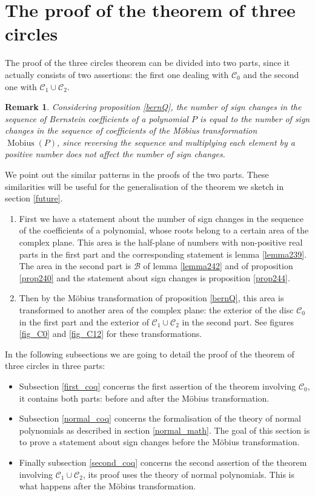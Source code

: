 \documentclass[11pt, a4paper]{article}
\newtheorem{remark}[mtheorem]{Remark}
\DeclareMathOperator{\Mob}{M{o}bius}
\newcommand{\ssb}{{\mathcal B}}
\newcommand{\ssc}{{\mathcal C}}
\begin{document}

\section{The proof of the theorem of three circles}

The proof of the three circles theorem can be divided into two parts, since it actually consists of two assertions: the first one dealing with $\ssc_0$ and the second one with $\ssc_1 \cup \ssc_2$.

\begin{remark}
Considering proposition \ref{bernQ}, the number of sign changes in the sequence of Bernstein coefficients of a polynomial $P$ is equal to the number of sign changes in the sequence of coefficients of the M\"obius transformation $\Mob(P)$, since reversing the sequence and multiplying each element by a positive number does not affect the number of sign changes.
\label{obda2}
\end{remark}

We point out the similar patterns in the proofs of the two parts. These similarities will be useful for the generalisation of the theorem we sketch in section \ref{future}.
\begin{enumerate}
 \item First we have a statement about the number of sign changes in the sequence of the coefficients of a polynomial, whose roots belong to a certain area of the complex plane. This area is the half-plane of numbers with non-positive real parts in the first part and the corresponding statement is lemma \ref{lemma239}.  The area in the second part is $\ssb$ of lemma \ref{lemma242} and of proposition \ref{prop240} and the statement about sign changes is proposition \ref{prop244}.
 \item Then by the M\"obius transformation of proposition \ref{bernQ}, this area is transformed to another area of the complex plane: the exterior of the disc $\ssc_0$ in the first part and the exterior of $\ssc_1 \cup \ssc_2$ in the second part. See figures \ref{fig_C0} and \ref{fig_C12} for these transformations.
\end{enumerate}

In the following subsections we are going to detail the proof of the theorem of three circles in three parts: \begin{itemize}
 \item Subsection \ref{first_coq} concerns the first assertion of the theorem involving $\ssc_0$, it contains both parts: before and after the M\"obius transformation.
 \item Subsection \ref{normal_coq} concerns the formalisation of the theory of normal polynomials as described in section \ref{normal_math}. The goal of this section is to prove a statement about sign changes before the M\"obius transformation.
 \item Finally subsection \ref{second_coq} concerns the second assertion of the theorem involving $\ssc_1 \cup \ssc_2$, its proof uses the theory of normal polynomials. This is what happens after the M\"obius transformation.
\end{itemize}
\end{document}
